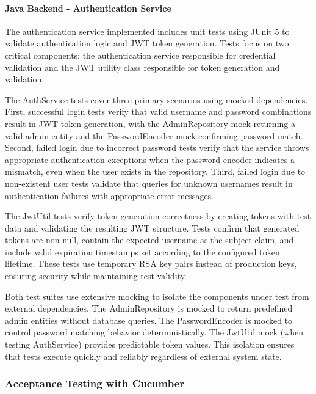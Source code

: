 \documentclass[12pt,a4paper]{article}
\begin{document}
\paragraph{Java Backend - Authentication Service}

The authentication service implemented includes unit tests using JUnit 5 to validate authentication logic and JWT token generation. Tests focus on two critical components: the authentication service responsible for credential validation and the JWT utility class responsible for token generation and validation.\newline

The AuthService tests cover three primary scenarios using mocked dependencies. First, successful login tests verify that valid username and password combinations result in JWT token generation, with the AdminRepository mock returning a valid admin entity and the PasswordEncoder mock confirming password match. Second, failed login due to incorrect password tests verify that the service throws appropriate authentication exceptions when the password encoder indicates a mismatch, even when the user exists in the repository. Third, failed login due to non-existent user tests validate that queries for unknown usernames result in authentication failures with appropriate error messages.\newline

The JwtUtil tests verify token generation correctness by creating tokens with test data and validating the resulting JWT structure. Tests confirm that generated tokens are non-null, contain the expected username as the subject claim, and include valid expiration timestamps set according to the configured token lifetime. These tests use temporary RSA key pairs instead of production keys, ensuring security while maintaining test validity.\newline

Both test suites use extensive mocking to isolate the components under test from external dependencies. The AdminRepository is mocked to return predefined admin entities without database queries. The PasswordEncoder is mocked to control password matching behavior deterministically. The JwtUtil mock (when testing AuthService) provides predictable token values. This isolation ensures that tests execute quickly and reliably regardless of external system state.

\subsubsection{Acceptance Testing with Cucumber}
\end{document}
